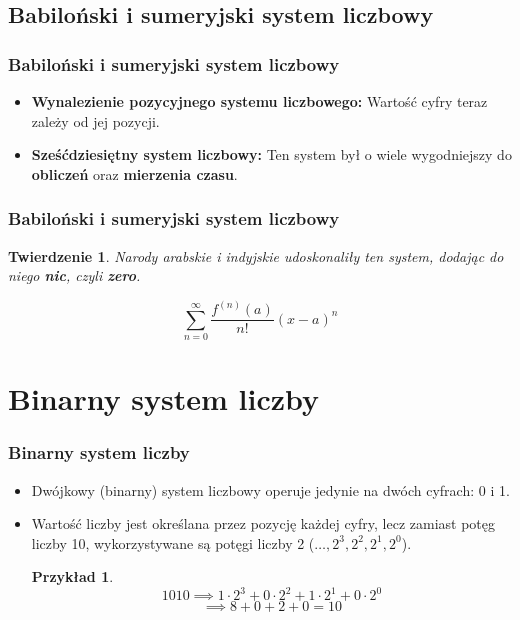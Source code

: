 \documentclass[12pt]{beamer}
\theoremstyle{plain}
\newtheorem{thm}{Twierdzenie}
\newtheorem{exm}{Przykład}
\begin{document}
\subsection{Babiloński i sumeryjski system liczbowy}

\begin{frame}
\frametitle{Babiloński i sumeryjski system liczbowy}
\begin{itemize}
    \item \textbf{Wynalezienie pozycyjnego systemu liczbowego:} Wartość cyfry teraz zależy od jej pozycji.
    \item \textbf{Sześćdziesiętny system liczbowy:} Ten system był o wiele wygodniejszy do \textbf{obliczeń} oraz \textbf{mierzenia czasu}.
\end{itemize}
\end{frame}

\begin{frame}
\frametitle{Babiloński i sumeryjski system liczbowy}
\begin{thm} 
    Narody arabskie i indyjskie udoskonaliły ten system, dodając do niego \textbf{nic}, czyli \textbf{zero}.
\end{thm} \pause

\begin{equation}
    \sum_{n=0}^{\infty} \frac{f^{(n)}(a)}{n!} (x-a)^n \tag{Wzór Taylora}
\end{equation}
\end{frame}

\section{Binarny system liczby}

\begin{frame}
\frametitle{Binarny system liczby}
\begin{itemize}
\item Dwójkowy (binarny) system liczbowy operuje jedynie na dwóch cyfrach: 0 i 1. \pause
\item Wartość liczby jest określana przez pozycję każdej cyfry, lecz zamiast potęg liczby 10, wykorzystywane są potęgi liczby 2 ($\dots, 2^3, 2^2, 2^1, 2^0$).\pause
\begin{exm}
$$
\text{1010} \implies \text{$1 \cdot 2^3 + 0 \cdot 2^2 + 1 \cdot 2^1 + 0 \cdot 2^0$}
$$
$$
\implies \text{$8 + 0 + 2 + 0 = 10$}
$$
\end{exm}
\end{itemize}
\end{frame}
\end{document}
